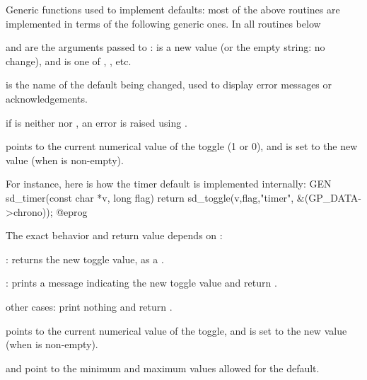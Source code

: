 

\noindent Generic functions used to implement defaults: most of the above
routines are implemented in terms of the following generic ones. In all
routines below

\item {} and  are the arguments passed to  :
 is a new value (or the empty string: no change), and  is one
of , , etc.

\item {} is the name of the default being changed, used to display error
messages or acknowledgements.


\item if  is neither  nor , an error is raised using
.

\item {} points to the current numerical value of the toggle (1 or 0),
and is set to the new value (when  is non-empty).

For instance, here is how the timer default is implemented internally:
\bprog
GEN
sd_timer(const char *v, long flag)
{ return sd_toggle(v,flag,"timer", &(GP_DATA->chrono)); }
@eprog

The exact behavior and return value depends on :

\item {}: returns the new toggle value, as a .

\item {}: prints a message indicating the new toggle value
and return .

\item other cases: print nothing and return .



\item {} points to the current numerical value of the toggle, and is set
to the new value (when  is non-empty).

\item {} and  point to the minimum and maximum values allowed
for the default.

